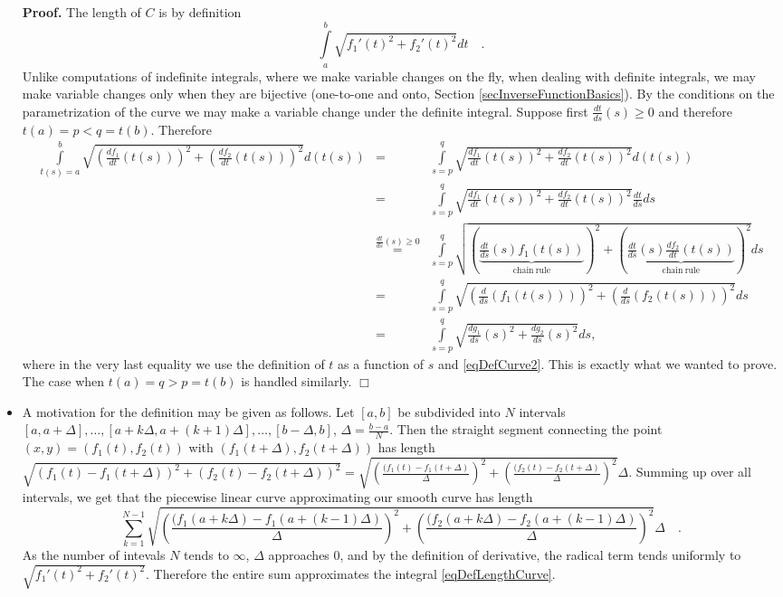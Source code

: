\documentclass[12pt]{book}
\newenvironment{proof}[1][]{ \textbf{Proof#1.} }{$\Box$\medskip}
\begin{document}
\begin{itemize}
\begin{proof}
The length of $C$ is by definition 
\[
\int\limits_{a}^b \sqrt{f_1'(t)^2+f_2'(t)^2}dt \quad . 
\]
Unlike computations of indefinite integrals, where we make variable changes on the fly, when dealing with definite integrals, we may make variable changes only when they are bijective (one-to-one and onto, Section \ref{secInverseFunctionBasics}). By the conditions on the parametrization of the curve we may make a variable change under the definite integral. Suppose first $\frac{dt}{ds}(s)\geq 0$ and therefore $t(a)=p<q=t(b)$. Therefore
\[
\begin{array}{rcl}
\displaystyle \int\limits_{t(s)=a}^b \sqrt{\left(\frac{df_1}{dt}(t(s))\right)^2+\left(\frac{df_2}{dt}(t(s))\right)^2}d(t(s)) &=& \displaystyle  \int\limits_{s=p}^q\sqrt{\frac{df_1}{dt}(t(s))^2+\frac{df_2}{dt}(t(s))^2}d(t(s))\\
&=& \displaystyle \int\limits_{s=p}^q \sqrt{\frac{df_1}{dt}(t(s))^2+\frac{df_2}{dt}(t(s))^2} \frac{dt}{ds}ds \\
&\stackrel{\frac{dt}{ds}(s)\geq 0}{=}&\displaystyle \int\limits_{s=p}^q \sqrt{ \left(\underbrace{\frac{dt}{ds}(s)f_1(t(s))}_{\mathrm{chain~rule}}\right)^2+\left(\underbrace{\frac{dt}{ds}(s)\frac{df_2}{dt}(t(s))}_{\mathrm{chain~rule}}\right)^2}ds \\
&=&\displaystyle \int\limits_{s=p}^q \sqrt{ \left(\frac{d}{ds}\left(f_1(t(s))\right)\right)^2+ \left(\frac{d}{ds}\left(f_2(t(s))\right)\right)^2}ds \\
&=&\displaystyle \int\limits_{s=p}^q \sqrt{ \frac{dg_1}{ds}(s)^2+ \frac{dg_2}{ds}(s)^2}ds,
\quad
\end{array}
\]
where in the very last equality we use the definition of $t$ as a function of $s$ and \eqref{eqDefCurve2}. This is exactly what we wanted to prove. The case when $t(a)=q>p=t(b)$ is handled similarly.
\end{proof}
\item A motivation for the definition may be given as follows. Let $[a,b]$ be subdivided into $N$ intervals $[a,a+\Delta ], \dots, [a+k\Delta, a+(k+1)\Delta],\dots, [b-\Delta, b]$, $\Delta=\frac{b-a}{N}$. Then the straight segment connecting the point $(x,y)=(f_1(t), f_2(t))$ with $(f_1(t+\Delta), f_2(t+\Delta))$ has length $\sqrt{(f_1(t)-f_1(t+\Delta))^2 + (f_2(t)-f_2(t+\Delta))^2}= \sqrt{\left(\frac{(f_1(t)-f_1(t+\Delta)}{\Delta}\right)^2 + \left(\frac{(f_2(t)- f_2(t+\Delta)}{\Delta} \right)^2}\Delta$. Summing up over all intervals, we get that the piecewise linear curve approximating our smooth curve has length
\[
\sum_{k=1}^{N-1} \sqrt{\left(\frac{(f_1(a+k\Delta)-f_1(a+(k-1)\Delta)}{\Delta}\right)^2 + \left(\frac{(f_2(a+k\Delta)- f_2(a+(k-1)\Delta)}{\Delta} \right)^2}\Delta\quad .
\]
As the number of intevals $N$ tends to $\infty$, $\Delta$ approaches 0, and by the definition of derivative, the radical term tends uniformly to $\sqrt{f_1'(t)^2+f_2'(t)^2}$. Therefore the entire sum approximates the integral \eqref{eqDefLengthCurve}.


\end{itemize}
\end{document}
